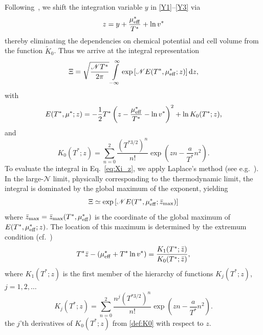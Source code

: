 \documentclass[pdflatex,sn-mathphys-num]{sn-jnl}%
\theoremstyle{thmstyleone}%
\theoremstyle{thmstyletwo}%
\theoremstyle{thmstylethree}%
\begin{document}
	Following~\cite{KD22}, we shift the integration variable $y$ in \eqref{Y1}--\eqref{Y3} via
	\begin{equation}
		z = y + \frac{\mu^*_{\rm eff}}{T^*} + \ln v^*
	\end{equation}
	thereby eliminating the dependencies on chemical potential and cell volume from the function $\tilde{K}_0$. Thus we arrive at the integral representation
	\begin{equation}
		\label{eq:Xi_z}
		\Xi = \sqrt{\frac{\mathscr{N} T^*}{2\pi}} \int\limits_{-\infty}^{\infty} \exp \left[\mathscr{N} E(T^*, \mu^*_{\rm eff}; z)\right] {\rm d} z,
	\end{equation}
	with
	\begin{equation}
		\label{def:E}
		E(T^*,\mu^*;z) = -\frac{1}{2}T^* \left(z - \frac{\mu^*_{\rm eff}}{T^*} - \ln v^*\right)^2 + \ln K_0(T^*;z),
	\end{equation}
	and
	\begin{equation}
		\label{def:K0}
		K_0(T^*;z) = \sum_{n=0}^{2} \frac{\left(T^{*3/2}\right)^n}{n!} \exp\left(zn - \frac{a}{T^*}n^2\right).
	\end{equation}
	To evaluate the integral in Eq.~\eqref{eq:Xi_z}, we apply Laplace's method (see e.g.~\cite{BenderOrszag99}). In the large-$\mathscr{N}$ limit, physically  corresponding to the thermodynamic limit, the integral is dominated by the global maximum of the exponent, yielding
	\begin{equation}\label{Laplace}
		\Xi \simeq \exp\left[\mathscr{N} E(T^*,\mu^*_{\rm eff}; \bar{z}_{\rm max})\right]
	\end{equation}
	where $\bar{z}_{\rm max} = \bar{z}_{\rm max}(T^*,\mu^*_{\rm eff})$ is the coordinate of the global maximum of $E(T^*,\mu^*_{\rm eff}; z)$.
	The location of this maximum is determined by the extremum condition (cf.~\cite{KKD20,KD22,RDKPS26a})
	\begin{equation}
		\label{eq:extremum}
		T^* \bar{z} - \left(\mu^*_{\rm eff} + T^* \ln v^*\right) = \frac{K_1(T^*; \bar{z})}{K_0(T^*; \bar{z})},
	\end{equation}
	where $K_1(T^*; z)$ is the first member of the hierarchy of functions $K_j(T^*; z)$, $j=1, 2, \ldots $
	\begin{equation}
		\label{def:Kj}
		K_j(T^*; z) = \sum_{n=0}^2 \frac{n^j \left(T^{*3/2}\right)^n}{n!} \exp\left(z n - \frac{a}{T^*}n^2\right).
	\end{equation}
	the $j$'th derivatives of $K_0(T^*;z)$ from \eqref{def:K0} with respect to $z$.
	
\end{document}
